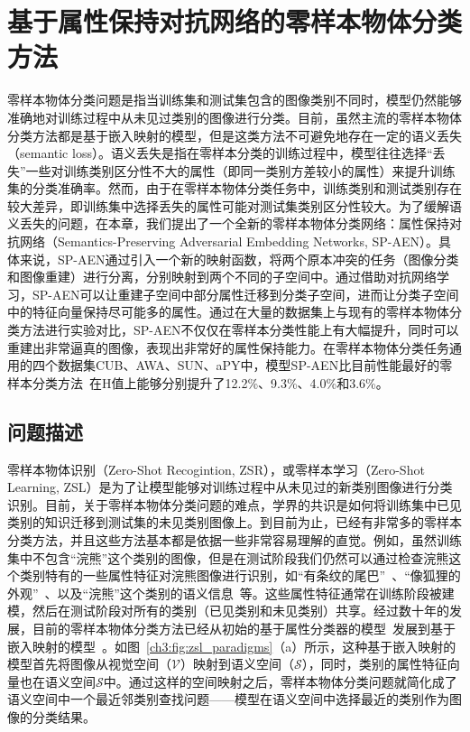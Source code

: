 \chapter{基于属性保持对抗网络的零样本物体分类方法}

零样本物体分类问题是指当训练集和测试集包含的图像类别不同时，模型仍然能够准确地对训练过程中从未见过类别的图像进行分类。目前，虽然主流的零样本物体分类方法都是基于嵌入映射的模型，但是这类方法不可避免地存在一定的语义丢失（semantic loss）。语义丢失是指在零样本分类的训练过程中，模型往往选择“丢失”一些对训练类别区分性不大的属性（即同一类别方差较小的属性）来提升训练集的分类准确率。然而，由于在零样本物体分类任务中，训练类别和测试类别存在较大差异，即训练集中选择丢失的属性可能对测试集类别区分性较大。为了缓解语义丢失的问题，在本章，我们提出了一个全新的零样本物体分类网络：属性保持对抗网络（Semantics-Preserving Adversarial Embedding Networks, SP-AEN）。具体来说，SP-AEN通过引入一个新的映射函数，将两个原本冲突的任务（图像分类和图像重建）进行分离，分别映射到两个不同的子空间中。通过借助对抗网络学习，SP-AEN可以让重建子空间中部分属性迁移到分类子空间，进而让分类子空间中的特征向量保持尽可能多的属性。通过在大量的数据集上与现有的零样本物体分类方法进行实验对比，SP-AEN不仅仅在零样本分类性能上有大幅提升，同时可以重建出非常逼真的图像，表现出非常好的属性保持能力。在零样本物体分类任务通用的四个数据集CUB、AWA、SUN、aPY中，模型SP-AEN比目前性能最好的零样本分类方法~\cite{xian2017zero}在H值上能够分别提升了12.2\%、9.3\%、4.0\%和3.6\%。


\section{问题描述}

零样本物体识别（Zero-Shot Recogintion, ZSR），或零样本学习（Zero-Shot Learning, ZSL）是为了让模型能够对训练过程中从未见过的新类别图像进行分类识别。目前，关于零样本物体分类问题的难点，学界的共识是如何将训练集中已见类别的知识迁移到测试集的未见类别图像上。到目前为止，已经有非常多的零样本分类方法，并且这些方法基本都是依据一些非常容易理解的直觉。例如，虽然训练集中不包含“浣熊”这个类别的图像，但是在测试阶段我们仍然可以通过检查浣熊这个类别特有的一些属性特征对浣熊图像进行识别，如“有条纹的尾巴”~\cite{farhadi2009describing,lampert2009learning,zhang2013attribute,li2010object}、“像狐狸的外观”~\cite{torresani2010efficient,li2010object}、以及“浣熊”这个类别的语义信息~\cite{pennington2014glove,mikolov2013distributed}等。这些属性特征通常在训练阶段被建模，然后在测试阶段对所有的类别（已见类别和未见类别）共享。经过数十年的发展，目前的零样本物体分类方法已经从初始的基于属性分类器的模型~\cite{lampert2009learning}发展到基于嵌入映射的模型~\cite{akata2015label,frome2013devise,weston2010large}。如图~\ref{ch3:fig:zsl_paradigms}（a）所示，这种基于嵌入映射的模型首先将图像从视觉空间（$\mathcal{V}$）映射到语义空间（$\mathcal{S}$），同时，类别的属性特征向量也在语义空间$\mathcal{S}$中。通过这样的空间映射之后，零样本物体分类问题就简化成了语义空间中一个最近邻类别查找问题——模型在语义空间中选择最近的类别作为图像的分类结果。

